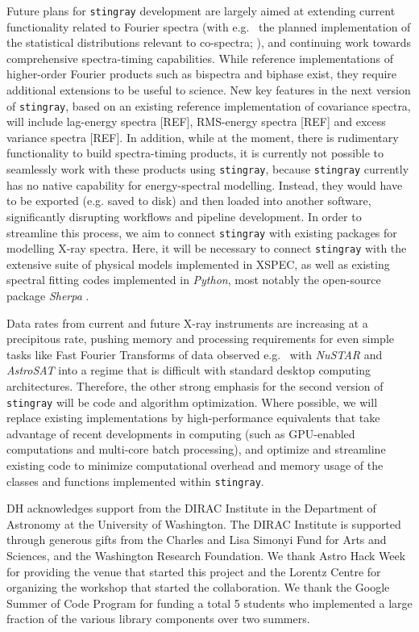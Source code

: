 \documentclass[twocolumn]{aastex62}
\newcommand{\stingray}{\texttt{stingray}\xspace}
\begin{document}
Future plans for \stingray development are largely aimed at extending current functionality related to Fourier spectra (with e.g.~ the planned implementation of the statistical distributions relevant to co-spectra; \citealt{huppenkothen2017}), and continuing work towards comprehensive spectra-timing capabilities. While reference implementations of higher-order Fourier products such as bispectra and biphase exist, they require additional extensions to be useful to science. New key features in the next version of \stingray, based on an existing reference implementation of covariance spectra, will include lag-energy spectra [REF], RMS-energy spectra [REF] and excess variance spectra [REF]. In addition, while at the moment, there is rudimentary functionality to build spectra-timing products, it is currently not possible to seamlessly work with these products using \stingray, because \stingray currently has no native capability for energy-spectral modelling. Instead, they would have to be exported (e.g. saved to disk) and then loaded into another software, significantly disrupting workflows and pipeline development. In order to streamline this process, we aim to connect \stingray with existing packages for modelling X-ray spectra. Here, it will be necessary to connect \stingray with the extensive suite of physical models implemented in XSPEC, as well as existing spectral fitting codes implemented in \textit{Python}, most notably the open-source package \textit{Sherpa} \citep{sherpa}.

Data rates from current and future X-ray instruments are increasing at a precipitous rate, pushing memory and processing requirements for even simple tasks like Fast Fourier Transforms of data observed e.g.~ with \textit{NuSTAR} and \textit{AstroSAT} \citep{singh2014} into a regime that is difficult with standard desktop computing architectures. Therefore, the other strong emphasis for the second version of \stingray will be code and algorithm optimization. Where possible, we will replace existing implementations by high-performance equivalents that take advantage of recent developments in computing (such as GPU-enabled computations and multi-core batch processing), and optimize and streamline existing code to minimize computational overhead and memory usage of the classes and functions implemented within \stingray. 


\acknowledgments
DH acknowledges support from the DIRAC Institute in the Department of Astronomy at the University of Washington. The DIRAC Institute is supported through generous gifts from the Charles and Lisa Simonyi Fund for Arts and Sciences, and the Washington Research Foundation.
We thank Astro Hack Week for providing the venue that started this project and the Lorentz Centre for organizing the workshop that started the collaboration. We thank the Google Summer of Code Program for funding a total 5 students who implemented a large fraction of the various library components over two summers.
\end{document}
